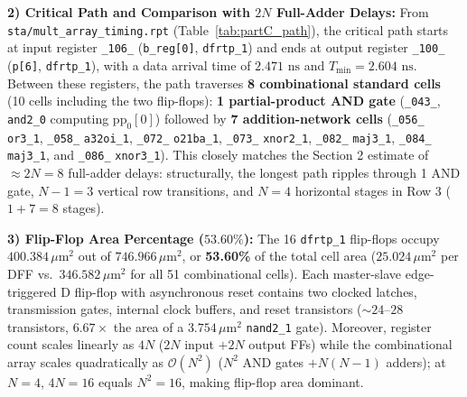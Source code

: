 \documentclass[conference,10pt]{IEEEtran}
\begin{document}
\textbf{2) Critical Path and Comparison with $2N$ Full-Adder Delays:}
From \texttt{sta/mult\_array\_timing.rpt} (Table~\ref{tab:partC_path}), the critical path starts at input register \texttt{\_106\_} (\texttt{b\_reg[0]}, \texttt{dfrtp\_1}) and ends at output register \texttt{\_100\_} (\texttt{p[6]}, \texttt{dfrtp\_1}), with a data arrival time of $2.471\text{ ns}$ and $T_{\min} = 2.604\text{ ns}$. Between these registers, the path traverses \textbf{8 combinational standard cells} (10 cells including the two flip-flops): \textbf{1 partial-product AND gate} (\texttt{\_043\_}, \texttt{and2\_0} computing $\text{pp}_0[0]$) followed by \textbf{7 addition-network cells} (\texttt{\_056\_} \texttt{or3\_1}, \texttt{\_058\_} \texttt{a32oi\_1}, \texttt{\_072\_} \texttt{o21ba\_1}, \texttt{\_073\_} \texttt{xnor2\_1}, \texttt{\_082\_} \texttt{maj3\_1}, \texttt{\_084\_} \texttt{maj3\_1}, and \texttt{\_086\_} \texttt{xnor3\_1}). This closely matches the Section 2 estimate of $\approx 2N = 8$ full-adder delays: structurally, the longest path ripples through 1 AND gate, $N-1 = 3$ vertical row transitions, and $N = 4$ horizontal stages in Row 3 ($1 + 7 = 8$ stages).

\textbf{3) Flip-Flop Area Percentage ($53.60\%$):}
The 16 \texttt{dfrtp\_1} flip-flops occupy $400.384\,\mu\text{m}^2$ out of $746.966\,\mu\text{m}^2$, or \textbf{53.60\%} of the total cell area ($25.024\,\mu\text{m}^2$ per DFF vs.\ $346.582\,\mu\text{m}^2$ for all 51 combinational cells). Each master-slave edge-triggered D flip-flop with asynchronous reset contains two clocked latches, transmission gates, internal clock buffers, and reset transistors ($\sim 24\text{--}28$ transistors, $6.67\times$ the area of a $3.754\,\mu\text{m}^2$ \texttt{nand2\_1} gate). Moreover, register count scales linearly as $4N$ ($2N$ input $+ 2N$ output FFs) while the combinational array scales quadratically as $\mathcal{O}(N^2)$ ($N^2$ AND gates $+ N(N-1)$ adders); at $N = 4$, $4N = 16$ equals $N^2 = 16$, making flip-flop area dominant.
\end{document}
